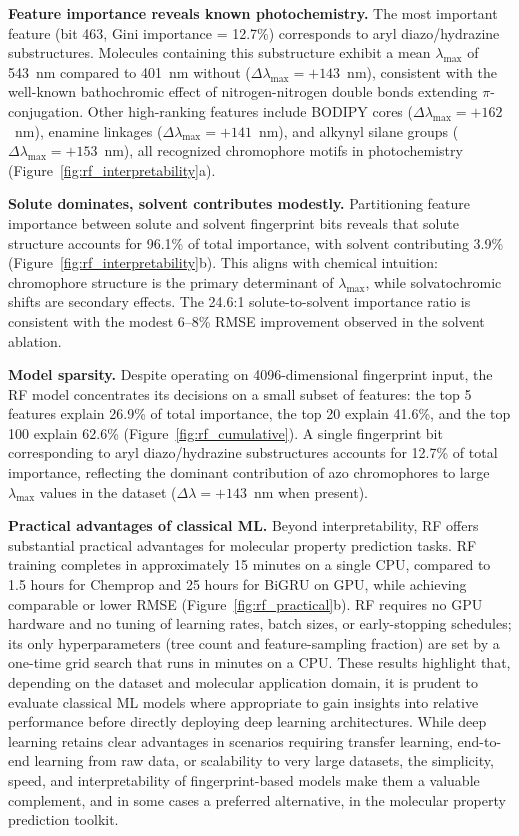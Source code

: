 \documentclass[journal=jcisd8,manuscript=article]{achemso}
\begin{document}
\textbf{Feature importance reveals known photochemistry.}
The most important feature (bit 463, Gini importance = 12.7\%) corresponds to aryl diazo/hydrazine substructures.
Molecules containing this substructure exhibit a mean $\lambda_{\max}$ of 543~nm compared to 401~nm without ($\Delta\lambda_{\max} = +143$~nm), consistent with the well-known bathochromic effect of nitrogen-nitrogen double bonds extending $\pi$-conjugation.
Other high-ranking features include BODIPY cores ($\Delta\lambda_{\max} = +162$~nm), enamine linkages ($\Delta\lambda_{\max} = +141$~nm), and alkynyl silane groups ($\Delta\lambda_{\max} = +153$~nm), all recognized chromophore motifs in photochemistry (Figure~\ref{fig:rf_interpretability}a).

\textbf{Solute dominates, solvent contributes modestly.}
Partitioning feature importance between solute and solvent fingerprint bits reveals that solute structure accounts for 96.1\% of total importance, with solvent contributing 3.9\% (Figure~\ref{fig:rf_interpretability}b).
This aligns with chemical intuition: chromophore structure is the primary determinant of $\lambda_{\max}$, while solvatochromic shifts are secondary effects.
The 24.6:1 solute-to-solvent importance ratio is consistent with the modest 6--8\% RMSE improvement observed in the solvent ablation.

\textbf{Model sparsity.}
Despite operating on 4096-dimensional fingerprint input, the RF model concentrates its decisions on a small subset of features: the top 5 features explain 26.9\% of total importance, the top 20 explain 41.6\%, and the top 100 explain 62.6\% (Figure~\ref{fig:rf_cumulative}).
A single fingerprint bit corresponding to aryl diazo/hydrazine substructures accounts for 12.7\% of total importance, reflecting the dominant contribution of azo chromophores to large $\lambda_{\max}$ values in the dataset ($\Delta\lambda = +143$~nm when present).

\textbf{Practical advantages of classical ML.}
Beyond interpretability, RF offers substantial practical advantages for molecular property prediction tasks.
RF training completes in approximately 15 minutes on a single CPU, compared to 1.5 hours for Chemprop and 25 hours for BiGRU on GPU, while achieving comparable or lower RMSE (Figure~\ref{fig:rf_practical}b).
RF requires no GPU hardware and no tuning of learning rates, batch sizes, or early-stopping schedules; its only hyperparameters (tree count and feature-sampling fraction) are set by a one-time grid search that runs in minutes on a CPU.
These results highlight that, depending on the dataset and molecular application domain, it is prudent to evaluate classical ML models where appropriate to gain insights into relative performance before directly deploying deep learning architectures.
While deep learning retains clear advantages in scenarios requiring transfer learning, end-to-end learning from raw data, or scalability to very large datasets, the simplicity, speed, and interpretability of fingerprint-based models make them a valuable complement, and in some cases a preferred alternative, in the molecular property prediction toolkit.
\end{document}
